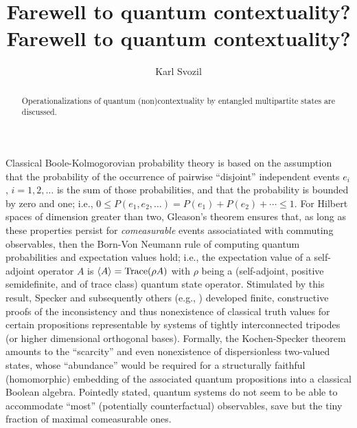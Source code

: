 \documentclass[prl,showpacs,showkeys,amsfonts]{revtex4}
\begin{document}
\title{\bf Farewell to quantum contextuality?}


\coverpage



\title{Farewell to quantum contextuality?}

\author{Karl Svozil}


\begin{abstract}
Operationalizations of quantum (non)contextuality by entangled multipartite states are discussed.
\end{abstract}



\maketitle


Classical Boole-Kolmogorovian probability theory is based on the assumption
that the probability of the occurrence
of pairwise ``disjoint'' independent events $e_i$, $i=1,2, \ldots$
is the sum of those probabilities, and that the probability is bounded by zero and one;
i.e.,
$0\le  P(e_1,e_2,\ldots )= P(e_1)+P(e_2)+\cdots \le 1$.
For Hilbert spaces of dimension greater than two,
Gleason's theorem \cite{Gleason,rich-bridge,hru-pit-2003} ensures that,
as long as these properties persist for {\it comeasurable} events associatiated with
commuting observables,
then the Born-Von Neumann rule
of computing quantum probabilities and expectation values \cite{v-neumann-49} hold;
i.e.,
the expectation value of a self-adjoint operator $A$ is
$\langle A\rangle ={\rm Trace}(\rho A)$
with $\rho$ being a (self-adjoint, positive semidefinite, and of trace class)
quantum state operator.
Stimulated by this result, Specker \cite{specker-60}
and subsequently others (e.g.,
\cite{kamber64,kamber65,ZirlSchl-65,bell-66,kochen1,Alda,Alda2,peres,mermin-93,svozil-tkadlec,tkadlec-00})
developed  finite, constructive proofs
of the inconsistency and thus nonexistence of classical truth values for certain
propositions representable by
systems of tightly interconnected tripodes (or higher dimensional orthogonal bases).
Formally, the Kochen-Specker theorem amounts to the ``scarcity''
and even nonexistence of dispersionless two-valued states,
whose ``abundance''  would be required for a structurally faithful (homomorphic)
embedding of the associated quantum propositions
into a classical Boolean algebra.
Pointedly stated, quantum systems do not seem to be able to accommodate
``most'' (potentially counterfactual) observables,
save but the tiny fraction of maximal comeasurable ones.
\end{document}
